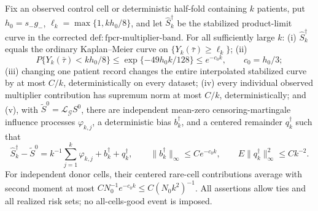 Fix an observed control cell or deterministic half-fold containing \(k\) patients, put \(h_0=s_-g_-\), \(\ell_k=\max\{1,kh_0/8\}\), and let \(\widehat S_k^\dagger\) be the stabilized product-limit curve in the corrected \(\mathrm{def:fpcr\mbox{-}multiplier\mbox{-}band}\). For all sufficiently large \(k\): (i) \(\widehat S_k^\dagger\) equals the ordinary Kaplan--Meier curve on \(\{Y_k(\bar\tau)\ge\ell_k\}\); (ii)
\[
 P\{Y_k(\bar\tau)<kh_0/8\}
 \le \exp\{-49h_0k/128\}\le e^{-c_0k},
 \qquad c_0=h_0/3;
\]
(iii) changing one patient record changes the entire interpolated stabilized curve by at most \(C/k\), deterministically on every dataset; (iv) every individual observed multiplier contribution has supremum norm at most \(C/k\), deterministically; and (v), with \(\widetilde S^0=\mathcal L_{\mathcal G}S^0\), there are independent mean-zero censoring-martingale influence processes \(\varphi_{k,j}\), a deterministic bias \(b_k^\dagger\), and a centered remainder \(q_k^\dagger\) such that
\[
 \widehat S_k^\dagger-\widetilde S^0
 =k^{-1}\sum_{j=1}^k\varphi_{k,j}+b_k^\dagger+q_k^\dagger,
 \qquad
 \|b_k^\dagger\|_\infty\le Ce^{-c_0k},
 \qquad
 E\|q_k^\dagger\|_\infty^2\le Ck^{-2}.
\]
For independent donor cells, their centered rare-cell contributions average with second moment at most \(CN_0^{-1}e^{-c_0k}\le C(N_0k^2)^{-1}\). All assertions allow ties and all realized risk sets; no all-cells-good event is imposed.